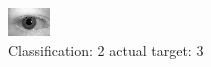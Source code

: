 \begin{figure}[h!]
\begin{center}
\includegraphics[width=0.60\columnwidth]{figures/ID650_class_2_target_3.png}
\end{center}
\caption{ Classification: 2 actual target: 3}
\label{fig:ID650_class_2_target_3}
\end{figure}
